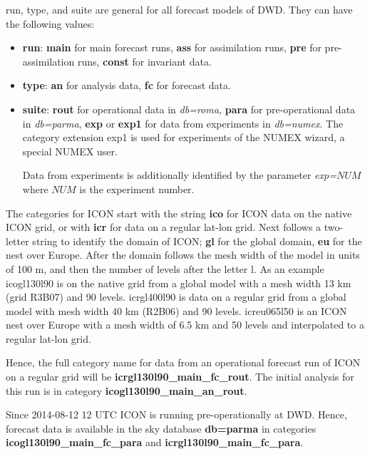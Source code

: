 run, type, and suite are general for all forecast models of DWD. They can have the 
following values:
\begin{itemize}
 \item \textbf{run}: \textbf{main} for main forecast runs,
                     \textbf{ass} for assimilation runs,
                     \textbf{pre} for pre-assimilation runs,
                     \textbf{const} for invariant data.
 \item \textbf{type}: \textbf{an} for analysis data,
                      \textbf{fc} for forecast data.
 \item \textbf{suite}: \textbf{rout} for operational data in \emph{db=roma,}
                       \textbf{para} for pre-operational data in \emph{db=parma},
                       \textbf{exp} or \textbf{exp1} for data from experiments in
                       \emph{db=numex}. The category extension exp1 is used for
                       experiments of the NUMEX wizard, a special NUMEX user.

                       Data from experiments is additionally
                       identified by the parameter \emph{exp=}$NUM$ where $NUM$ is
                       the experiment number.
\end{itemize}

The categories for ICON start with the string \textbf{ico} for ICON data on the native
ICON grid, or with \textbf{icr} for data on a regular lat-lon grid.
Next follows a two-letter string to identify the domain of ICON; \textbf{gl} for the
global domain, \textbf{eu} for the nest over Europe. After the domain follows the
mesh width of the model in units of 100 m, and then the number of levels after the
letter l. As an example icogl130l90 is on the native grid from a global model with a mesh width
13 km (grid R3B07) and 90 levels. icrgl400l90 is data on a regular grid from a global model with
mesh width 40 km (R2B06) and 90 levels. icreu065l50 is an ICON nest over Europe with a
mesh width of 6.5 km and 50 levels and interpolated to a regular lat-lon grid.

Hence, the full category name for data from an operational forecast run of ICON on a
regular grid will be \textbf{icrgl130l90\_main\_fc\_rout}. The initial analysis for this
run is in category \textbf{icogl130l90\_main\_an\_rout}.

\begin{note}
Since 2014-08-12 12 UTC ICON is running pre-operationally at DWD. Hence, forecast data
is available in the sky database \textbf{db=parma} in categories
\textbf{icogl130l90\_main\_fc\_para} and \textbf{icrgl130l90\_main\_fc\_para}.
\end{note}

